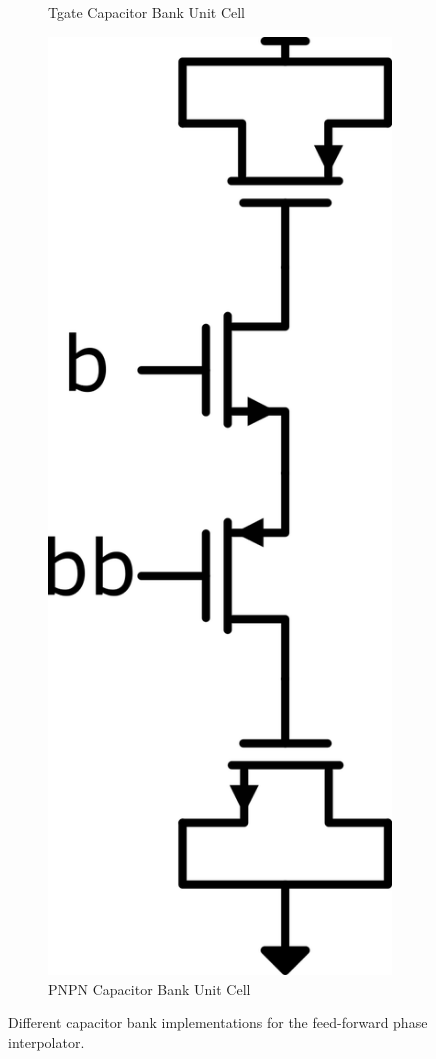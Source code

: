 \begin{figure}[H]
\begin{subfigure}[b]{0.2\linewidth}
    \caption{Tgate Capacitor Bank Unit Cell}
    \label{fig:Tgate_cap}
  \end{subfigure}
  \hfill
  \begin{subfigure}[b]{0.15\linewidth}
    \centering
    \includegraphics[width=\linewidth]{figures/Schematics/PNPN_cap.png}
    \caption{PNPN Capacitor Bank Unit Cell}
    \label{fig:PNPN_cap}
  \end{subfigure}
  \hfill\null
  \caption{Different capacitor bank implementations for the feed-forward phase interpolator.}
\end{figure}

